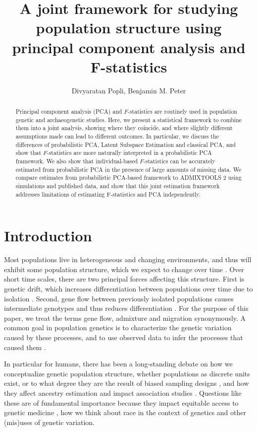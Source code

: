 \documentclass[12pt]{article}
\title{A joint framework for studying population structure using principal component analysis and F-statistics}
\author{Divyaratan Popli, Benjamin M. Peter}
\begin{document}
\maketitle


\begin{abstract}

\noindent Principal component analysis (PCA) and $F$-statistics are routinely used in population genetic and archaeogenetic studies.  Here, we present a statistical framework to combine them into a joint analysis, showing where they coincide, and where slightly different assumptions made can lead to different outcomes. In particular, we discuss the differences of probabilistic PCA, Latent Subspace Estimation and classical PCA, and show that $F$-statistics are more naturally interpreted in a probabilistic PCA framework. We also show that individual-based $F$-statistics can be accurately estimated from probabilistic PCA in the presence of large amounts of missing data. We compare estimates from probabilistic PCA-based framework to ADMIXTOOLS 2 using simulations and published data, and show that this joint estimation framework addresses limitations of estimating F-statistics and PCA independently.

\end{abstract}

\section{Introduction}

Most populations live in heterogeneous and changing environments, and thus will exhibit some population structure, which we expect to change over time \citep{charlesworth_effective_2009,allendorf_genetics_2017}. Over short time scales, there are two principal forces affecting this structure. First is genetic drift, which increases differentiation between populations over time due to isolation \citep{song_differentiation_2006}. Second, gene flow between previously isolated populations causes intermediate genotypes and thus reduces differentiation \citep{lenormand_gene_2002}. For the purpose of this paper, we treat the terms gene flow, admixture and migration synonymously. A common goal in population genetics is to characterize the genetic variation caused by these processes, and to use observed data to infer the processes that caused them \citep{ellegren_determinants_2016}.

In particular for humans, there has been a long-standing debate on how we conceptualize genetic population structure, whether populations as discrete units exist, or to what degree they are the result of biased sampling designs \citep{serre_evidence_2004, rosenberg_clines_2005, peter_genetic_2020}, and how they affect ancestry estimation \citep{mathieson_what_2020, simon_contribution_2023} and impact association studies \citep{price_principal_2006}. Questions like these are of fundamental importance because they impact equitable access to genetic medicine \citep{popejoy_genomics_2016}, how we think about race in the context of genetics \citep{lewontin_apportionment_1972, novembre_background_2022} and other (mis)uses of genetic variation.
\end{document}

